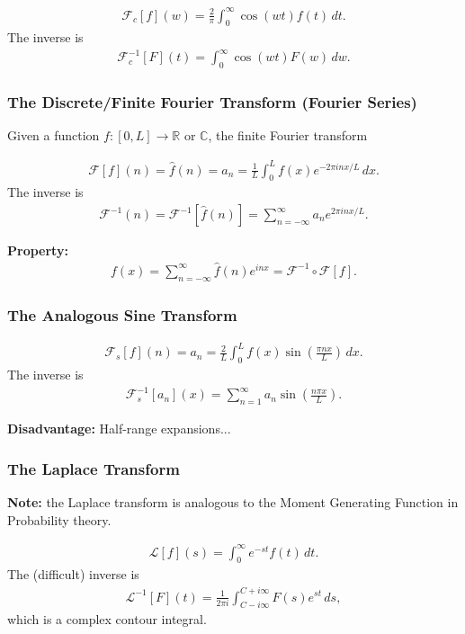 \documentclass{article}
\theoremstyle{definition}
\newcommand{\R}{\mathbb{R}}
\newcommand{\lag}{\mathcal{L}}
\newcommand{\F}{\mathcal{F}}
\begin{document}
\begin{align*}
\F_c[f](w) = \frac{2}{\pi}\int^\infty_{0}\cos(wt)f(t)\,dt.
\end{align*}
The inverse is
\begin{align*}
\F^{-1}_c[F](t) = \int_{0}^\infty\cos(wt)F(w)\,dw.
\end{align*}

\subsubsection{The Discrete/Finite Fourier Transform (Fourier Series)}

Given a function $f : [0,L] \to \R$ or $\mathbb{C}$, the finite Fourier transform

\begin{align*}
\F[f](n) = \hat{f}(n) = a_n = \frac{1}{L}\int^L_0 f(x)e^{-2\pi inx/L}\,dx.
\end{align*}
The inverse is
\begin{align*}
\F^{-1}(n) = \F^{-1}[\hat{f}(n)] = \sum^\infty_{n=-\infty} a_n e^{2\pi inx/L}. 
\end{align*}

\textbf{Property:}
\begin{align*}
f(x) = \sum^\infty_{n=-\infty} \hat{f}(n)e^{inx} = \F^{-1}\circ \F[f].
\end{align*} 

\subsubsection{The Analogous Sine Transform}


\begin{align*}
\F_s[f](n) = a_n = \frac{2}{L}\int^L_0 f(x)\sin\left(\frac{\pi nx}{L}\right)\,dx.
\end{align*}
The inverse is
\begin{align*}
\F^{-1}_s[a_n](x) = \sum^\infty_{n=1}a_n \sin\left(\frac{n\pi x}{L}\right).
\end{align*}

\textbf{Disadvantage:} Half-range expansions...

\subsubsection{The Laplace Transform}

\textbf{Note:} the Laplace transform is analogous to the Moment Generating Function in Probability theory. 

\begin{align*}
\lag[f](s) = \int^\infty_0 e^{-st}f(t)\,dt.
\end{align*}
The (difficult) inverse is
\begin{align*}
\lag^{-1}[F](t) = \frac{1}{2\pi i} \int^{C+i\infty}_{C-i\infty}F(s)e^{st}\,ds,
\end{align*}
which is a complex contour integral.\\
\end{document}
